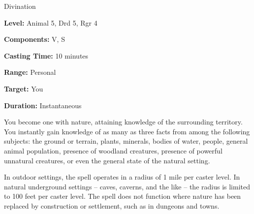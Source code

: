 
Divination

\textbf{Level:} Animal 5, Drd 5, Rgr 4

\textbf{Components:} V, S

\textbf{Casting Time:} 10 minutes

\textbf{Range:} Personal

\textbf{Target:} You

\textbf{Duration:} Instantaneous

You become one with nature, attaining knowledge of the surrounding territory. You 
instantly gain knowledge of as many as three facts from among the following subjects: 
the ground or terrain, plants, minerals, bodies of water, people, general animal 
population, presence of woodland creatures, presence of powerful unnatural creatures, 
or even the general state of the natural setting.

In outdoor settings, the spell operates in a radius of 1 mile per caster level. 
In natural underground settings -- caves, caverns, and the like -- the radius is 
limited to 100 feet per caster level. The spell does not function where nature 
has been replaced by construction or settlement, such as in dungeons and towns.

